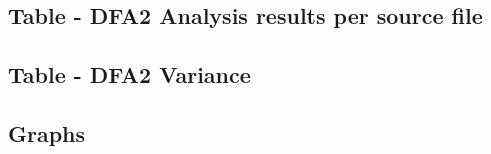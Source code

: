 
\subsection{Table - DFA2 Analysis results per source file}

\newpage
\subsection{Table - DFA2 Variance}\label{FullResultsVariance}


\newpage
\subsection{Graphs}
\begin{center}

\end{center}
